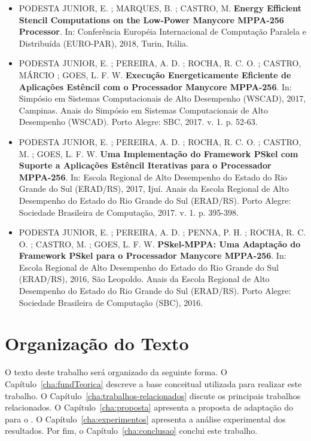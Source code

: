 \begin{itemize}
    \item PODESTA JUNIOR, E. ; MARQUES, B. ; CASTRO, M. \textbf{Energy Efficient
            Stencil Computations on the Low-Power Manycore MPPA-256 Processor}.
        In: Conferência Européia Internacional de Computação Paralela e
        Distribuída (EURO-PAR), 2018, Turin, Itália.

	\item PODESTA JUNIOR, E. ; PEREIRA, A. D. ; ROCHA, R. C. O. ; CASTRO, MÁRCIO ; GOES, L. F. W. \textbf{Execução Energeticamente Eficiente de Aplicações Estêncil com o Processador Manycore MPPA-256}. In: Simpósio em Sistemas Computacionais de Alto Desempenho (WSCAD), 2017, Campinas. Anais do Simpósio em Sistemas Computacionais de Alto Desempenho (WSCAD). Porto Alegre: SBC, 2017. v. 1. p. 52-63.

	\item PODESTA JUNIOR, E. ; PEREIRA, A. D. ; ROCHA, R. C. O. ; CASTRO, M. ; GOES, L. F. W. \textbf{Uma Implementação do Framework PSkel com Suporte a Aplicações Estêncil Iterativas para o Processador MPPA-256}. In: Escola Regional de Alto Desempenho do Estado do Rio Grande do Sul (ERAD/RS), 2017, Ijuí. Anais da Escola Regional de Alto Desempenho do Estado do Rio Grande do Sul (ERAD/RS). Porto Alegre: Sociedade Brasileira de Computação, 2017. v. 1. p. 395-398.

	\item PODESTA JUNIOR, E. ; PEREIRA, A. D. ; PENNA, P. H. ; ROCHA, R. C. O. ; CASTRO, M. ; GOES, L. F. W. \textbf{PSkel-MPPA: Uma Adaptação do Framework PSkel para o Processador Manycore MPPA-256}. In: Escola Regional de Alto Desempenho do Estado do Rio Grande do Sul (ERAD/RS), 2016, São Leopoldo. Anais da Escola Regional de Alto Desempenho do Estado do Rio Grande do Sul (ERAD/RS). Porto Alegre: Sociedade Brasileira de Computação (SBC), 2016.
\end{itemize}

\section{Organização do Texto}
O texto deste trabalho será organizado da seguinte forma. O Capítulo~\ref{cha:fundTeorica} descreve a base conceitual
utilizada para realizar este trabalho. O Capítulo~\ref{cha:trabalhos-relacionados} discute os principais trabalhos relacionados.
O Capítulo~\ref{cha:proposta} apresenta a proposta de adaptação do \pskel para o \mppa.
O Capítulo~\ref{cha:experimentos} apresenta a análise experimental dos resultados. Por fim, o
Capítulo~\ref{cha:conclusao} conclui este trabalho.


